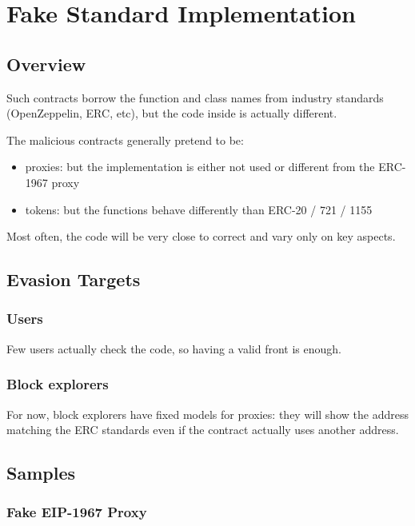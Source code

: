 \section{Fake Standard Implementation} \label{sec:fake-implementation}

\subsection{Overview}

Such contracts borrow the function and class names from industry standards (OpenZeppelin, ERC, etc), but the code inside is actually different.

The malicious contracts generally pretend to be:

\begin{itemize}
\item{proxies: but the implementation is either not used or different from the ERC-1967 proxy}
\item{tokens: but the functions behave differently than ERC-20 / 721 / 1155}
\end{itemize}

Most often, the code will be very close to correct and vary only on key aspects.

\subsection{Evasion Targets}

\subsubsection{Users}

Few users actually check the code, so having a valid front is enough.

\subsubsection{Block explorers}

For now, block explorers have fixed models for proxies: they will show the address matching the ERC standards even if the contract actually uses another address.

\subsection{Samples}

\subsubsection{Fake EIP-1967 Proxy}

